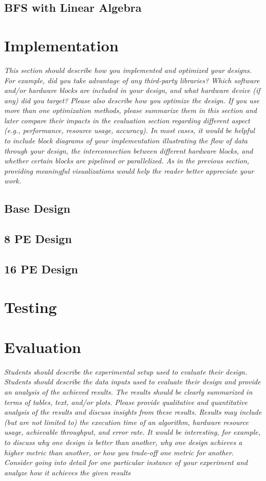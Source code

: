 \documentclass[10pt]{article}
\begin{document}
\subsection{BFS with Linear Algebra}


\section{Implementation}
\textit{This section should describe how you implemented and optimized your designs. For
example, did you take advantage of any third-party libraries? Which software and/or hardware blocks
are included in your design, and what hardware device (if any) did you target? Please also describe
how you optimize the design. If you use more than one optimization methods, please summarize them
in this section and later compare their impacts in the evaluation section regarding different aspect (e.g.,
performance, resource usage, accuracy). In most cases, it would be helpful to include block diagrams
of your implementation illustrating the flow of data through your design, the interconnection between
different hardware blocks, and whether certain blocks are pipelined or parallelized. As in the previous
section, providing meaningful visualizations would help the reader better appreciate your work.}

\subsection{Base Design}


\subsection{8 PE Design}


\subsection{16 PE Design}


\section{Testing}


\section{Evaluation}
\textit{Students should describe the experimental setup used to evaluate their design. Students
should describe the data inputs used to evaluate their design and provide an analysis of the achieved
results. The results should be clearly summarized in terms of tables, text, and/or plots. Please provide
qualitative and quantitative analysis of the results and discuss insights from these results. Results may
include (but are not limited to) the execution time of an algorithm, hardware resource usage, achievable
throughput, and error rate. It would be interesting, for example, to discuss why one design is better
than another, why one design achieves a higher metric than another, or how you trade-off one metric
for another. Consider going into detail for one particular instance of your experiment and analyze how
it achieves the given results}
\end{document}
